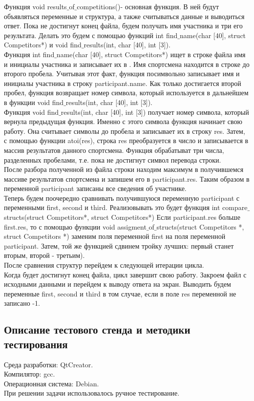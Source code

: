 \documentclass[12pt,a4paper]{report}
\begin{document}
Функция void results$\_$of$\_$competitions()- основная функция. В ней будут объявляться переменные и структура, а также считываться данные и выводиться ответ. Пока не достигнут конец файла, будем получать имя участника и три его результата. Делать это будем с помощью функций int find$\_$name(char [40], struct Competitors*) и void find$\_$results(int, char [40], int [3]).\\
Функция int find$\_$name(char [40], struct Competitors*) ищет в строке файла имя и инициалы участника и записывает их в . Имя спортсмена находится в строке до второго пробела. Учитывая этот факт, функция посимвольно записывает имя и инициалы участника в строку participant.name. Как только достигается второй пробел, функция возвращает номер символа, который используется в дальнейшем в функции void find$\_$results(int, char [40], int [3]).\\
Функция void find$\_$results(int, char [40], int [3]) получает номер символа, который вернула предыдущая функция. Именно с этого символа функция начинает свою работу. Она считывает символы до пробела и записывает их в строку res. Затем, с помощью функции atoi(res), строка res преобразуется в число и записывается в массив результатов данного спортсмена. Функция обрабатыват три числа, разделенных пробелами, т.е. пока не достигнут символ перевода строки. \\
После разбора полученной из файла строки находим максимум в получившемся массиве результатов спортсмена и запишем его в participant.res. Таким образом в переменной participant записаны все сведения об участнике. \\
Теперь будем поочередно сравнивать получившуюся переменную participant с переменными first, second и third. Реализовывать это будет функция int compare$\_$structs(struct Competitors*, struct Competitors*) Если participant.res больше first.res, то с помощью функции void assigment$\_$of$\_$structs(struct Competitors *, struct Competitors *) заменим поля переменной first на поля переменной participant. Затем, той же функцией сдвинем тройку лучших: первый станет вторым, второй - третьим). \\
После сравнения структур перейдем к следующей итерации цикла. \\
Когда будет достигнут конец файла, цикл завершит свою работу. Закроем файл с исходными данными и перейдем к выводу ответа на экран. Выводить будем переменные first, second и third в том случае, если в поле res переменной не записано -1. 
\subsection{Описание тестового стенда и методики тестирования}
Среда разработки: QtCreator.\\
Компилятор: gcc. \\
Операционная система: Debian. \\
При решении задачи использовалось ручное тестирование. 
\end{document}
